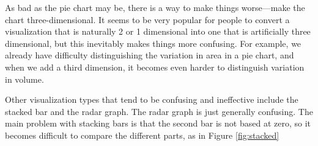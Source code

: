 As bad as the pie chart may be, there is a way to make things worse---make the chart three-dimensional.  It seems to be very popular for people to convert a visualization that is naturally 2 or 1 dimensional into one that is artificially three dimensional, but this inevitably makes things more confusing.  For example, we already have difficulty distinguishing the variation in area in a pie chart, and when we add a third dimension, it becomes even harder to distinguish variation in volume.


Other visualization types that tend to be confusing and ineffective include the stacked bar and the radar graph.  The radar graph is just generally confusing. The main problem with stacking bars is that the second bar is not based at zero, so it becomes difficult to compare the different parts, as in Figure \ref{fig:stacked}

